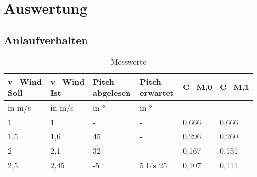 \section{Auswertung}
\label{sec:Auswertung}
\subsection{Anlaufverhalten}
\begin{table}[ht!]
    \centering
    \caption{Messwerte}
    \label{tab_Messwerte_Anlauf_230615}
    \begin{tabular}{|l|l|l|l|l|l|}
        \hline
        \rowcolor[HTML]{70AD47} 
        {\color[HTML]{FFFFFF} \textbf{v\_Wind   Soll}} & {\color[HTML]{FFFFFF} \textbf{v\_Wind Ist}} & {\color[HTML]{FFFFFF} \textbf{Pitch abgelesen}} & {\color[HTML]{FFFFFF} \textbf{Pitch erwartet}} & {\color[HTML]{FFFFFF} \textbf{C\_M,0}} & {\color[HTML]{FFFFFF} \textbf{C\_M,1}} \\ \hline
        \rowcolor[HTML]{70AD47} 
        in m/s                                         & in m/s                                      & in °                                            & in °                                           & -                                      & -                                      \\ \hline
        \rowcolor[HTML]{E2EFDA} 
        1                                              & 1                                           & -                                               & -                                              & 0,666                                  & 0,666                                  \\ \hline
        \rowcolor[HTML]{C6E0B4} 
        1,5                                            & 1,6                                         & 45                                              & -                                              & 0,296                                  & 0,260                                  \\ \hline
        \rowcolor[HTML]{E2EFDA} 
        2                                              & 2,1                                         & 32                                              & -                                              & 0,167                                  & 0,151                                  \\ \hline
        \rowcolor[HTML]{C6E0B4} 
        2,5                                            & 2,45                                        & -5                                              & 5 bis 25                                       & 0,107                                  & 0,111                                  \\ \hline
    \end{tabular}
\end{table}

